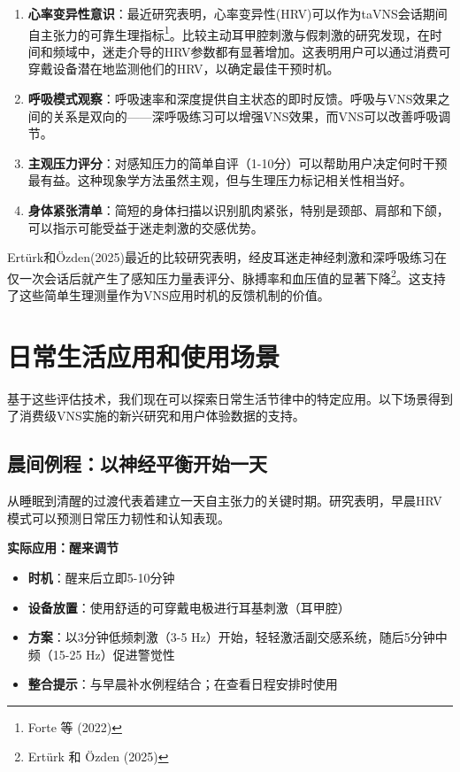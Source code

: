 \documentclass[
  Letterpaper,
]{scrbook}
\providecommand{\tightlist}{%
  \setlength{\itemsep}{0pt}\setlength{\parskip}{0pt}}\usepackage{longtable,booktabs,array}
\begin{document}
\begin{enumerate}
\def\labelenumi{\arabic{enumi}.}
\item
  \textbf{心率变异性意识}：最近研究表明，心率变异性(HRV)可以作为taVNS会话期间自主张力的可靠生理指标\footnote{Forte
    等 (2022)}。比较主动耳甲腔刺激与假刺激的研究发现，在时间和频域中，迷走介导的HRV参数都有显著增加。这表明用户可以通过消费可穿戴设备潜在地监测他们的HRV，以确定最佳干预时机。
\item
  \textbf{呼吸模式观察}：呼吸速率和深度提供自主状态的即时反馈。呼吸与VNS效果之间的关系是双向的------深呼吸练习可以增强VNS效果，而VNS可以改善呼吸调节。
\item
  \textbf{主观压力评分}：对感知压力的简单自评（1-10分）可以帮助用户决定何时干预最有益。这种现象学方法虽然主观，但与生理压力标记相关性相当好。
\item
  \textbf{身体紧张清单}：简短的身体扫描以识别肌肉紧张，特别是颈部、肩部和下颌，可以指示可能受益于迷走刺激的交感优势。
\end{enumerate}

Ertürk和Özden(2025)最近的比较研究表明，经皮耳迷走神经刺激和深呼吸练习在仅一次会话后就产生了感知压力量表评分、脉搏率和血压值的显著下降\footnote{Ertürk
  和 Özden (2025)}。这支持了这些简单生理测量作为VNS应用时机的反馈机制的价值。

\section{日常生活应用和使用场景}\label{ux65e5ux5e38ux751fux6d3bux5e94ux7528ux548cux4f7fux7528ux573aux666f}

基于这些评估技术，我们现在可以探索日常生活节律中的特定应用。以下场景得到了消费级VNS实施的新兴研究和用户体验数据的支持。

\subsection{晨间例程：以神经平衡开始一天}\label{ux6668ux95f4ux4f8bux7a0bux4ee5ux795eux7ecfux5e73ux8861ux5f00ux59cbux4e00ux5929}

从睡眠到清醒的过渡代表着建立一天自主张力的关键时期。研究表明，早晨HRV模式可以预测日常压力韧性和认知表现。

\textbf{实际应用：醒来调节}

\begin{itemize}
\tightlist
\item
  \textbf{时机}：醒来后立即5-10分钟
\item
  \textbf{设备放置}：使用舒适的可穿戴电极进行耳基刺激（耳甲腔）
\item
  \textbf{方案}：以3分钟低频刺激（3-5
  Hz）开始，轻轻激活副交感系统，随后5分钟中频（15-25 Hz）促进警觉性
\item
  \textbf{整合提示}：与早晨补水例程结合；在查看日程安排时使用
\end{itemize}
\end{document}
